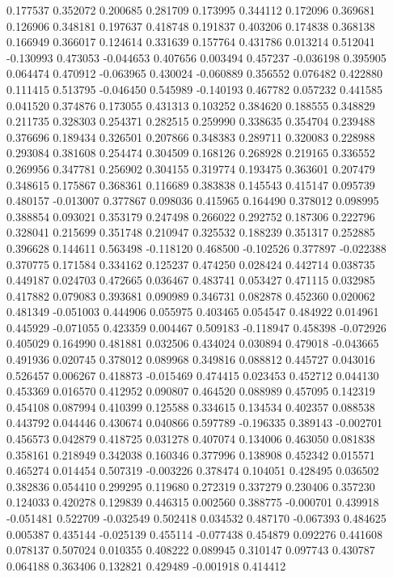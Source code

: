 0.177537
0.352072
0.200685
0.281709
0.173995
0.344112
0.172096
0.369681
0.126906
0.348181
0.197637
0.418748
0.191837
0.403206
0.174838
0.368138
0.166949
0.366017
0.124614
0.331639
0.157764
0.431786
0.013214
0.512041
-0.130993
0.473053
-0.044653
0.407656
0.003494
0.457237
-0.036198
0.395905
0.064474
0.470912
-0.063965
0.430024
-0.060889
0.356552
0.076482
0.422880
0.111415
0.513795
-0.046450
0.545989
-0.140193
0.467782
0.057232
0.441585
0.041520
0.374876
0.173055
0.431313
0.103252
0.384620
0.188555
0.348829
0.211735
0.328303
0.254371
0.282515
0.259990
0.338635
0.354704
0.239488
0.376696
0.189434
0.326501
0.207866
0.348383
0.289711
0.320083
0.228988
0.293084
0.381608
0.254474
0.304509
0.168126
0.268928
0.219165
0.336552
0.269956
0.347781
0.256902
0.304155
0.319774
0.193475
0.363601
0.207479
0.348615
0.175867
0.368361
0.116689
0.383838
0.145543
0.415147
0.095739
0.480157
-0.013007
0.377867
0.098036
0.415965
0.164490
0.378012
0.098995
0.388854
0.093021
0.353179
0.247498
0.266022
0.292752
0.187306
0.222796
0.328041
0.215699
0.351748
0.210947
0.325532
0.188239
0.351317
0.252885
0.396628
0.144611
0.563498
-0.118120
0.468500
-0.102526
0.377897
-0.022388
0.370775
0.171584
0.334162
0.125237
0.474250
0.028424
0.442714
0.038735
0.449187
0.024703
0.472665
0.036467
0.483741
0.053427
0.471115
0.032985
0.417882
0.079083
0.393681
0.090989
0.346731
0.082878
0.452360
0.020062
0.481349
-0.051003
0.444906
0.055975
0.403465
0.054547
0.484922
0.014961
0.445929
-0.071055
0.423359
0.004467
0.509183
-0.118947
0.458398
-0.072926
0.405029
0.164990
0.481881
0.032506
0.434024
0.030894
0.479018
-0.043665
0.491936
0.020745
0.378012
0.089968
0.349816
0.088812
0.445727
0.043016
0.526457
0.006267
0.418873
-0.015469
0.474415
0.023453
0.452712
0.044130
0.453369
0.016570
0.412952
0.090807
0.464520
0.088989
0.457095
0.142319
0.454108
0.087994
0.410399
0.125588
0.334615
0.134534
0.402357
0.088538
0.443792
0.044446
0.430674
0.040866
0.597789
-0.196335
0.389143
-0.002701
0.456573
0.042879
0.418725
0.031278
0.407074
0.134006
0.463050
0.081838
0.358161
0.218949
0.342038
0.160346
0.377996
0.138908
0.452342
0.015571
0.465274
0.014454
0.507319
-0.003226
0.378474
0.104051
0.428495
0.036502
0.382836
0.054410
0.299295
0.119680
0.272319
0.337279
0.230406
0.357230
0.124033
0.420278
0.129839
0.446315
0.002560
0.388775
-0.000701
0.439918
-0.051481
0.522709
-0.032549
0.502418
0.034532
0.487170
-0.067393
0.484625
0.005387
0.435144
-0.025139
0.455114
-0.077438
0.454879
0.092276
0.441608
0.078137
0.507024
0.010355
0.408222
0.089945
0.310147
0.097743
0.430787
0.064188
0.363406
0.132821
0.429489
-0.001918
0.414412
